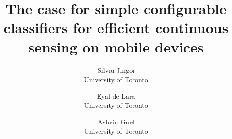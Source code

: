 \documentclass[letterpaper,twocolumn,10pt]{sig-alternate-10pt}
\begin{document}
\date{}


\title{\Large \bf The case for simple configurable classifiers for efficient continuous sensing on mobile devices}

\author{
{\rm Silviu Jingoi}\\
University of Toronto
\and
{\rm Eyal de Lara}\\
University of Toronto
\and
{\rm Ashvin Goel}\\
University of Toronto
} %

\maketitle











\end{document}
